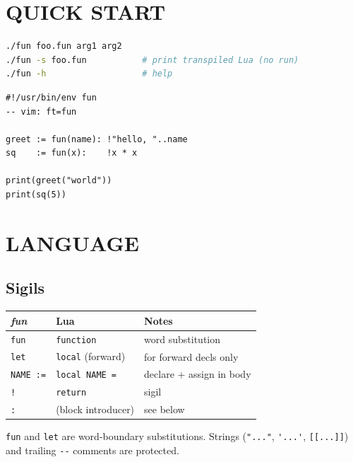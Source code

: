 \documentclass[10pt,twocolumn]{article}
\newcounter{none}
\providecommand{\passthrough}[1]{#1}
\begin{document}
\section{QUICK START}\label{quick-start}

\begin{lstlisting}[language=bash]
./fun foo.fun arg1 arg2
./fun -s foo.fun           # print transpiled Lua (no run)
./fun -h                   # help
\end{lstlisting}

\begin{lstlisting}[language=Fun]
#!/usr/bin/env fun
-- vim: ft=fun

greet := fun(name): !"hello, "..name
sq    := fun(x):    !x * x

print(greet("world"))
print(sq(5))
\end{lstlisting}

\section{LANGUAGE}\label{language}

\subsection{Sigils}\label{sigils}

{\def\LTcaptype{none} %
\begin{longtable}[]{@{}lll@{}}
\toprule\noalign{}
\emph{fun} & Lua & Notes \\
\midrule\noalign{}
\endhead
\bottomrule\noalign{}
\endlastfoot
\passthrough{\lstinline!fun!} & \passthrough{\lstinline!function!} &
word substitution \\
\passthrough{\lstinline!let!} & \passthrough{\lstinline!local!}
(forward) & for forward decls only \\
\passthrough{\lstinline!NAME :=!} &
\passthrough{\lstinline!local NAME =!} & declare + assign in body \\
\passthrough{\lstinline"!"} & \passthrough{\lstinline!return!} &
sigil \\
\passthrough{\lstinline!:!} & (block introducer) & see below \\
\end{longtable}
}

\passthrough{\lstinline!fun!} and \passthrough{\lstinline!let!} are
word-boundary substitutions. Strings (\passthrough{\lstinline!"..."!},
\passthrough{\lstinline!'...'!}, \passthrough{\lstinline![[...]]!}) and
trailing \passthrough{\lstinline!--!} comments are protected.
\end{document}

